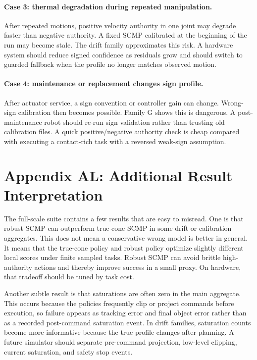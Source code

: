 \documentclass{article}
\begin{document}
\paragraph{Case 3: thermal degradation during repeated manipulation.}
After repeated motions, positive velocity authority in one joint may degrade faster than negative authority. A fixed SCMP calibrated at the beginning of the run may become stale. The drift family approximates this risk. A hardware system should reduce signed confidence as residuals grow and should switch to guarded fallback when the profile no longer matches observed motion.

\paragraph{Case 4: maintenance or replacement changes sign profile.}
After actuator service, a sign convention or controller gain can change. Wrong-sign calibration then becomes possible. Family G shows this is dangerous. A post-maintenance robot should re-run sign validation rather than trusting old calibration files. A quick positive/negative authority check is cheap compared with executing a contact-rich task with a reversed weak-sign assumption.

\section*{Appendix AL: Additional Result Interpretation}

The full-scale suite contains a few results that are easy to misread. One is that robust SCMP can outperform true-cone SCMP in some drift or calibration aggregates. This does not mean a conservative wrong model is better in general. It means that the true-cone policy and robust policy optimize slightly different local scores under finite sampled tasks. Robust SCMP can avoid brittle high-authority actions and thereby improve success in a small proxy. On hardware, that tradeoff should be tuned by task cost.

Another subtle result is that saturations are often zero in the main aggregate. This occurs because the policies frequently clip or project commands before execution, so failure appears as tracking error and final object error rather than as a recorded post-command saturation event. In drift families, saturation counts become more informative because the true profile changes after planning. A future simulator should separate pre-command projection, low-level clipping, current saturation, and safety stop events.
\end{document}
